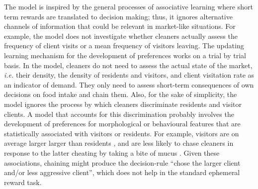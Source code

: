 \documentclass[]{rsos}%
\begin{document}
The model is inspired by the general processes of associative learning
where short term rewards are translated to decision making; thus, it
ignores alternative channels of information that could be relevant in
market-like situations. For example, the model does not investigate whether
cleaners actually assess the frequency of client visits or a mean frequency
of visitors leaving. The updating learning mechanism for the development
of preferences works on a trial by trial basis. In the model, cleaners
do not need to assess the actual state of the market, \emph{i.e.} their density,
the density of residents and visitors, and client visitation rate as an
indicator of demand. They only need to assess short-term consequences of
own decisions on food intake and chain them. Also, for the sake of
simplicity, the model ignores the process by which cleaners discriminate
residents and visitor clients. A model that accounts for this discrimination
probably involves the development of preferences for morphological or
behavioural features that are statistically associated with visitors
or residents. For example, visitors are on average larger larger
than residents \citep{bshary_Cleaner_2001a}, and are less likely to chase
cleaners in response to the latter cheating by taking a bite of
mucus \citep{bshary_Asymmetric_2002}. Given these associations, chaining might
produce the decision-rule ``chose the larger client and/or less aggressive
client'', which does not help in the standard ephemeral reward task.
\end{document}
